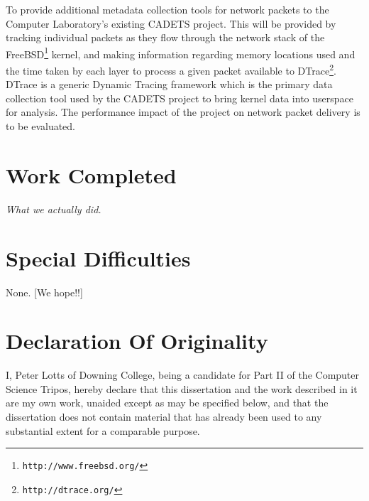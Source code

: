 \documentclass[a4paper,12pt,twoside,openright]{report}
\begin{document}
	To provide additional metadata collection tools for network packets to the Computer Laboratory's existing CADETS project. This will be provided by tracking individual packets as they flow through the network stack of the FreeBSD\footnote{\texttt{http://www.freebsd.org/}} kernel, and making information regarding memory locations used and the time taken by each layer to process a given packet available to DTrace\footnote{\texttt{http://dtrace.org/}}. DTrace is a generic Dynamic Tracing framework which is the primary data collection tool used by the CADETS project to bring kernel data into userspace for analysis. The performance impact of the project on network packet delivery is to be evaluated.
	
	
	\section*{Work Completed}
	
	\textit{What we actually did.}
	
	\section*{Special Difficulties}
	
	None. [We hope!!]
	
	\newpage
	\section*{Declaration Of Originality}
	
	I, Peter Lotts of Downing College, being a candidate for Part II of
	the Computer Science Tripos, hereby declare
	that this dissertation and the work described in it are my own work,
	unaided except as may be specified below, and that the dissertation
	does not contain material that has already been used to any substantial
	extent for a comparable purpose.
	
	\bigskip
	
	\medskip
	
	\tableofcontents
	
	\listoffigures
	
	
	
\end{document}
